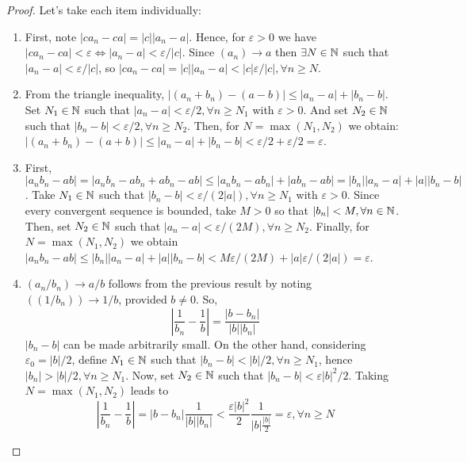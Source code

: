 \begin{proof}
    Let's take each item individually:
    \begin{enumerate}
        \item First, note $|ca_n - ca| = |c||a_n - a|$. Hence, for $\varepsilon > 0$ we have $|ca_n - ca| < \varepsilon \Leftrightarrow |a_n-a| < \varepsilon/|c|$. Since $( a_n ) \to a$ then $\exists N \in \mathbb{N}$ such that $|a_n - a| < \varepsilon / |c|$, so $|ca_n - ca| = |c||a_n-a| < |c|\varepsilon/|c|, \forall n \geq N$.
        \item From the triangle inequality, $|(a_n+b_n)-(a-b)| \leq |a_n-a|+|b_n-b|$. Set $N_1 \in \mathbb{N}$ such that $|a_n-a|< \varepsilon/2, \forall n \geq N_1$ with $\varepsilon > 0$. And set $N_2 \in \mathbb{N}$ such that $|b_n-b| < \varepsilon/2, \forall n \geq N_2$. Then, for $N = \max ( N_1, N_2)$ we obtain: $|(a_n+b_n)-(a+b)| \leq |a_n-a| + |b_n-b| < \varepsilon/2 + \varepsilon/2 = \varepsilon$.
        \item First, $|a_nb_n - ab| = |a_nb_n -ab_n + ab_n - ab| \leq |a_nb_n-ab_n| + |ab_n - ab| = |b_n||a_n-a| + |a||b_n-b|$. Take $N_1 \in \mathbb{N}$ such that $|b_n-b| < \varepsilon/(2|a|), \forall n \geq N_1$ with $\varepsilon > 0$. Since every convergent sequence is bounded, take $M > 0$ so that $|b_n| < M, \forall n \in \mathbb{N}$. Then, set $N_2 \in \mathbb{N}$ such that $|a_n-a| < \varepsilon/(2M), \forall n \geq N_2$. Finally, for $N = \max ( N_1, N_2)$ we obtain $|a_nb_n - ab| \leq |b_n||a_n-a| + |a||b_n-b| < M\varepsilon/(2M) + |a|\varepsilon/(2|a|) = \varepsilon$.
        \item $( a_n/b_n) \to a/b$ follows from the previous result by noting $((1/b_n)) \to 1/b$, provided $b \ne 0$. So,
        \begin{equation*}
            \left |
            \frac{1}{b_n} - \frac{1}{b}
            \right | = \frac{|b -b_n|}{|b||b_n|}
        \end{equation*}
        $|b_n-b|$ can be made arbitrarily small. On the other hand, considering $\varepsilon_0 = |b|/2$, define $N_1 \in \mathbb{N}$ such that $|b_n-b|<|b|/2, \forall n \geq N_1$, hence $|b_n| > |b|/2, \forall n \geq N_1$. Now, set $N_2 \in \mathbb{N}$ such that $|b_n-b| < \varepsilon|b|^2/2$. Taking $N = \max ( N_1, N_2)$ leads to
        \begin{equation*}
            \left|
                \frac{1}{b_n} - \frac{1}{b}
                \right| = 
                |b-b_n|\frac{1}{|b||b_n|} < \frac{\varepsilon |b|^2}{2} \frac{1}{|b|\frac{|b|}{2}} = \varepsilon, \forall n \geq N
        \end{equation*}
    \end{enumerate}
\end{proof}

